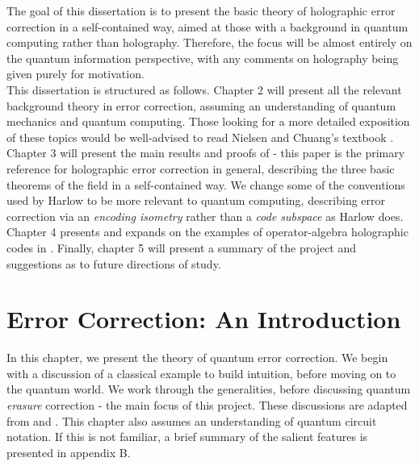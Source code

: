 \documentclass[12pt,a4paper]{report}
\numberwithin{equation}{section}
\theoremstyle{definition}
\theoremstyle{theorem}
\theoremstyle{theorem}
\theoremstyle{example}
\theoremstyle{definition}
\begin{document}
The goal of this dissertation is to present the basic theory of holographic error correction in a self-contained way, aimed at those with a background in quantum computing rather than holography. Therefore, the focus will be almost entirely on the quantum information perspective, with any comments on holography being given purely for motivation.\\
This dissertation is structured as follows. Chapter 2 will present all the relevant background theory in error correction, assuming an understanding of quantum mechanics and quantum computing. Those looking for a more detailed exposition of these topics would be well-advised to read Nielsen and Chuang's textbook \cite{NielsenChuang}. Chapter 3 will present the main results and proofs of \cite{Harlow} - this paper is the primary reference for holographic error correction in general, describing the three basic theorems of the field in a self-contained way. We change some of the conventions used by Harlow to be more relevant to quantum computing, describing error correction via an \textit{encoding isometry} rather than a \textit{code subspace} as Harlow does. Chapter 4 presents and expands on the examples of operator-algebra holographic codes in \cite{Pollack}. Finally, chapter 5 will present a summary of the project and suggestions as to future directions of study.


\chapter{Error Correction: An Introduction}

In this chapter, we present the theory of quantum error correction. We begin with a discussion of a classical example to build intuition, before moving on to the quantum world. We work through the generalities, before discussing quantum \textit{erasure} correction - the main focus of this project. These discussions are adapted from \cite{NielsenChuang} and \cite{Harlow}. This chapter also assumes an understanding of quantum circuit notation. If this is not familiar, a brief summary of the salient features is presented in appendix B.
\end{document}

